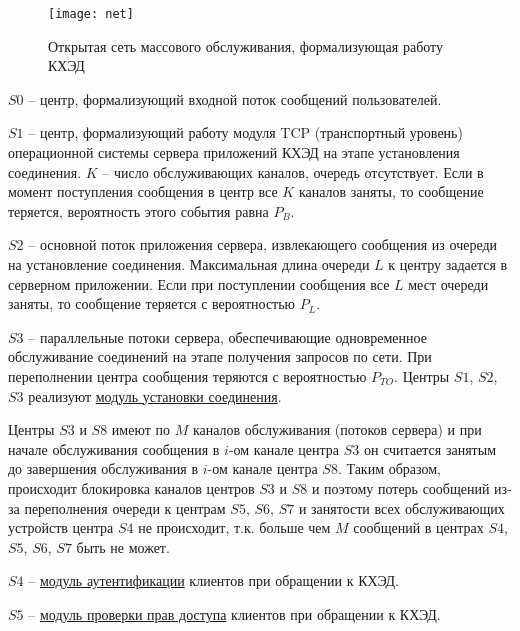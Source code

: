 \begin{figure}[h]
  \centering
  \texttt{[image: net]}
  \caption{Открытая сеть массового обслуживания, формализующая работу КХЭД}
  \label{img:net}
\end{figure}

$S0$ -- центр, формализующий входной поток сообщений пользователей.

\vspace{\baselineskip}
$S1$ -- центр, формализующий работу модуля TCP (транспортный уровень) операционной системы сервера приложений КХЭД на этапе установления соединения. $K$ – число обслуживающих каналов, очередь отсутствует. Если в момент поступления сообщения в центр все $K$ каналов заняты, то сообщение теряется, вероятность этого события равна $P_B$.

\vspace{\baselineskip}
$S2$ -- основной поток приложения сервера, извлекающего сообщения из очереди на установление соединения. Максимальная длина очереди $L$ к центру задается в серверном приложении. Если при поступлении сообщения все $L$ мест очереди заняты, то сообщение теряется с вероятностью $P_L$.

\vspace{\baselineskip}
$S3$ -- параллельные потоки сервера, обеспечивающие одновременное обслуживание соединений на этапе получения запросов по сети. При переполнении центра сообщения теряются с вероятностью $P_{TO}$.
Центры $S1$, $S2$, $S3$ реализуют \underline{модуль установки соединения}.

\vspace{\baselineskip}
Центры $S3$ и $S8$ имеют по $M$ каналов обслуживания (потоков сервера) и при начале обслуживания сообщения в $i$-ом канале центра $S3$ он считается занятым до завершения обслуживания в $i$-ом канале центра $S8$. Таким образом, происходит блокировка каналов центров $S3$ и $S8$ и поэтому потерь сообщений из-за переполнения очереди к центрам $S5$, $S6$, $S7$ и занятости всех обслуживающих устройств центра $S4$ не происходит, т.к. больше чем $M$ сообщений в центрах $S4$, $S5$, $S6$, $S7$ быть не может.

\vspace{\baselineskip}
$S4$ -- \underline{модуль аутентификации} клиентов при обращении к КХЭД.

\vspace{\baselineskip}
$S5$ -- \underline{модуль проверки прав доступа} клиентов при обращении к КХЭД.

